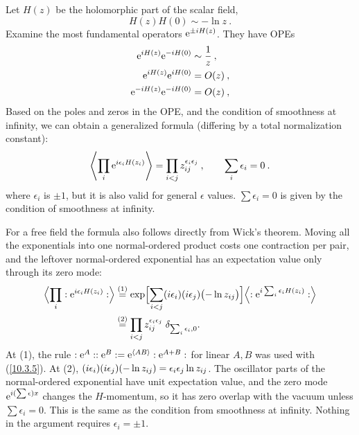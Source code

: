 	Let $H(z)$ be the holomorphic part of the scalar field,
	\begin{equation}
		H(z)H(0)\sim -\ln z \:. \label{10.3.5}
	\end{equation}
	Examine the most fundamental operators $\mathrm{e}^{\pm i H(z)}$. They have OPEs
	\begin{subequations}
		\begin{align}
			\mathrm{e}^{i H(z)}\mathrm{e}^{-i H(0)}&\sim \frac{1}{z} \:, \label{10.3.6a} \\
			\mathrm{e}^{i H(z)}\mathrm{e}^{i H(0)} &= O(z) \:, \label{10.3.6b} \\
			\mathrm{e}^{-i H(z)}\mathrm{e}^{-i H(0)}&= O(z) \:, \label{10.3.6c}
		\end{align} \label{10.3.6}
	\end{subequations}
	Based on the poles and zeros in the OPE, and the condition of smoothness at infinity, we can obtain a generalized formula (differing by a total normalization constant):
	\begin{equation}
		\left\langle \prod_{i}\mathrm{e}^{i\epsilon_{i}H(z_{i})}\right\rangle
		=\prod_{i<j} z_{ij}^{\epsilon_{i}\epsilon_{j}} \:, \qquad \sum_{i}\epsilon_{i} = 0\:.\label{10.3.7}
	\end{equation}
	where $\epsilon_{i}$ is $\pm 1$, but it is also valid for general $\epsilon$ values. $\sum\epsilon_{i}=0$ is given by the condition of smoothness at infinity.
	\begin{tcolorbox}[breakable]
		\begin{remark}
			For a free field the formula also follows directly from Wick's theorem. Moving all the exponentials into one normal-ordered product costs one contraction per pair, and the leftover normal-ordered exponential has an expectation value only through its zero mode:
			\begin{align*}
				\Bigl\langle\prod_i\mathrel{:}\mathrm{e}^{i\epsilon_iH(z_i)}\mathrel{:}\Bigr\rangle
				&\overset{(1)}{=}\exp\Bigl[\sum_{i<j}(i\epsilon_i)(i\epsilon_j)\bigl(-\ln z_{ij}\bigr)\Bigr]\Bigl\langle\mathrel{:}\mathrm{e}^{i\sum_i\epsilon_iH(z_i)}\mathrel{:}\Bigr\rangle\\
				&\overset{(2)}{=}\prod_{i<j}z_{ij}^{\epsilon_i\epsilon_j}\;\delta_{\sum_i\epsilon_i,0} .
			\end{align*}
			At (1), the rule $\mathrel{:}\mathrm{e}^{A}\mathrel{:}\mathrel{:}\mathrm{e}^{B}\mathrel{:}=\mathrm{e}^{\langle AB\rangle}\mathrel{:}\mathrm{e}^{A+B}\mathrel{:}$ for linear $A,B$ was used with (\ref{10.3.5}). At (2), $(i\epsilon_i)(i\epsilon_j)(-\ln z_{ij})=\epsilon_i\epsilon_j\ln z_{ij}$. The oscillator parts of the normal-ordered exponential have unit expectation value, and the zero mode $\mathrm{e}^{i(\sum\epsilon)x}$ changes the $H$-momentum, so it has zero overlap with the vacuum unless $\sum\epsilon_i=0$. This is the same as the condition from smoothness at infinity. Nothing in the argument requires $\epsilon_i=\pm1$.
		\end{remark}
	\end{tcolorbox}
	
